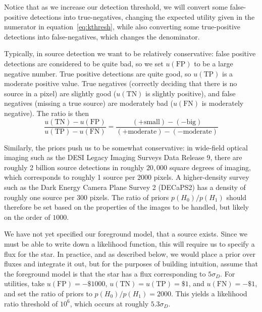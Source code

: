 \documentclass[11pt,letterpaper,linenumbers]{aastex7}
\newcommand{\equationname}{equation}
\newcommand{\eqnref}[1]{\mbox{\equationname~\ref{#1}}}
\newcommand{\sigd}{\sigma_{\scriptscriptstyle D}}
\newcommand{\truepos}{\ensuremath{\mathrm{TP}}}
\newcommand{\falsepos}{\ensuremath{\mathrm{FP}}}
\newcommand{\trueneg}{\ensuremath{\mathrm{TN}}}
\newcommand{\falseneg}{\ensuremath{\mathrm{FN}}}
\newcommand{\fg}{\ensuremath{H_1}}
\newcommand{\bg}{\ensuremath{H_0}}
\newcommand{\changed}[1]{#1}
\begin{document}
\changed{
Notice that as we increase our detection threshold, we will convert some false-positive
detections into true-negatives, changing the expected utility given in the
numerator in \eqnref{eq:kthresh}, while also converting some true-positive detections into
false-negatives, which changes the denominator.
}

Typically, in source detection we want to be relatively conservative:
false positive detections are considered to be quite bad, so we
set $u(\falsepos)$ to be a large negative number.  True positive
detections are quite good, so $u(\truepos)$ is a moderate positive
value.  True negatives (correctly deciding that there is no source in
a pixel) are slightly good ($u(\trueneg)$ is slightly positive), and
false negatives (missing a true source) are moderately bad
($u(\falseneg)$ is moderately negative).  The ratio is then
\begin{equation}
  \frac{u(\trueneg) - u(\falsepos)}{u(\truepos) - u(\falseneg)} = \frac{(+\textrm{small}) - (-\textrm{big})}{(+\textrm{moderate}) - (-\textrm{moderate})}
\end{equation}

Similarly, the priors push us to be somewhat conservative: in
wide-field optical imaging such as the DESI Legacy Imaging Surveys
\citep{lsoverview} Data Release 9, there are roughly 2 billion source
detections in roughly $20,000$ square degrees of imaging, which
corresponds to roughly 1 source per 2000 pixels.  A higher-density
survey such as the Dark Energy Camera Plane Survey 2 (DECaPS2)
\citep{decaps2} has a density of roughly one source per 300 pixels.
The ratio of priors $p(\bg) / p(\fg)$ should therefore be set based on
the properties of the images to be handled, but likely on the order of
$1000$.

We have not yet specified our foreground model, that a source exists.
Since we must be able to write down a likelihood function, this will
require us to specify a flux for the star.  In practice, and as
described below, we would place a prior over fluxes and integrate it
out, but for the purposes of building intuition, assume that the
foreground model is that the star has a flux corresponding to
$5 \sigd$.  For utilities, take $u(\falsepos) = -\$1000$, 
$u(\trueneg) = u(\truepos) = \$1$, and $u(\falseneg) = -\$1$, and
set the ratio of priors to $p(\bg)/p(\fg) = 2000$.
This yields a likelihood ratio threshold of $10^6$, which occurs at
roughly $5.3 \sigd$.
\end{document}
